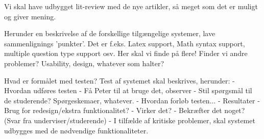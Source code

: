 
Vi skal have udbygget lit-review med de nye artikler, så meget som det er muligt og giver mening.

Herunder en beskrivelse af de forskellige tilgængelige systemer, lave sammenlignings 'punkter'. Det er f.eks. Latex support, Math syntax support, multiple question type support osv. Her skal vi finde på flere!
Finder vi andre problemer? Usability, design, whatever som halter?

Hvad er formålet med testen?
Test af systemet skal beskrives, herunder:
    - Hvordan udføres testen
        - Få Peter til at bruge det, observer
        - Stil spørgsmål til de studerende? Spørgeskemaer, whatever.
    - Hvordan forløb testen...
    - Resultater
        - Brug for redesign/ekstra funktionalitet?
        - Virker det?
        - Bekræfter det noget? (Svar fra underviser/studerende)
    -
I tilfælde af kritiske problemer, skal systemet udbygges med de nødvendige funktionaliteter.
